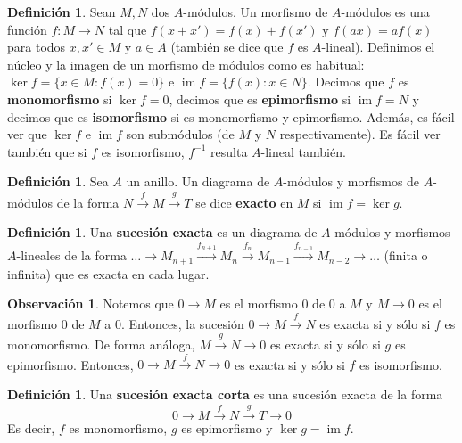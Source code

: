 \documentclass[12pt]{book}
\theoremstyle{definition}
\newtheorem{obs}[teo]{Observación}
\newtheorem{defn}[teo]{Definición}
\DeclareMathOperator{\im}{im}
\begin{document}
\begin{defn}
Sean $M,N$ dos $A$-módulos. Un morfismo de $A$-módulos es una función $f:M\to N$ tal que $f(x+x')=f(x)+f(x')$ y $f(ax)=af(x)$ para todos $x,x'\in M$ y $a\in A$ (también se dice que $f$ es $A$-lineal). Definimos el núcleo y la imagen de un morfismo de módulos como es habitual: $\ker f = \{x\in M : f(x)=0\}$ e $\im f = \{f(x):x\in N\}$. Decimos que $f$ es \textbf{monomorfismo} si $\ker f =0$, decimos que es \textbf{epimorfismo} si $\im f =N$ y decimos que es \textbf{isomorfismo} si es monomorfismo y epimorfismo. Además, es fácil ver que $\ker f$ e $\im f$ son submódulos (de $M$ y $N$ respectivamente). Es fácil ver también que si $f$ es isomorfismo, $f^{-1}$ resulta $A$-lineal también.
\end{defn}

\begin{defn}
Sea $A$ un anillo. Un diagrama de $A$-módulos y morfismos de $A$-módulos de la forma $N\stackrel{f}{\longrightarrow}M\stackrel{g}{\longrightarrow} T$ se dice \textbf{exacto} en $M$ si $\im f = \ker g$.
\end{defn}

\begin{defn}
Una \textbf{sucesión exacta} es un diagrama de $A$-módulos y morfismos $A$-lineales de la forma $\ldots \longrightarrow M_{n+1}\stackrel{f_{n+1}}{\longrightarrow} M_n \stackrel{f_{n}}{\longrightarrow} M_{n-1} \stackrel{f_{n-1}}{\longrightarrow}M_{n-2}\longrightarrow \ldots$ (finita o infinita) que es exacta en cada lugar.
\end{defn}

\begin{obs}
Notemos que $0\longrightarrow M$ es el morfismo $0$ de $0$ a $M$ y $M\longrightarrow 0$ es el morfismo $0$ de $M$ a $0$. Entonces, la sucesión $0\longrightarrow M\stackrel{f}{\longrightarrow} N$ es exacta si y sólo si $f$ es monomorfismo. De forma análoga, $M\stackrel{g}{\longrightarrow} N\longrightarrow 0$ es exacta si y sólo si $g$ es epimorfismo. Entonces, $0\longrightarrow M\stackrel{f}{\longrightarrow} N \longrightarrow 0$ es exacta si y sólo si $f$ es isomorfismo.
\end{obs}

\begin{defn}
Una \textbf{sucesión exacta corta} es una sucesión exacta de la forma $$0\longrightarrow M\stackrel{f}{\longrightarrow} N\stackrel{g}{\longrightarrow} T \longrightarrow 0$$ Es decir, $f$ es monomorfismo, $g$ es epimorfismo y $\ker g = \im f$.
\end{defn}
\end{document}
